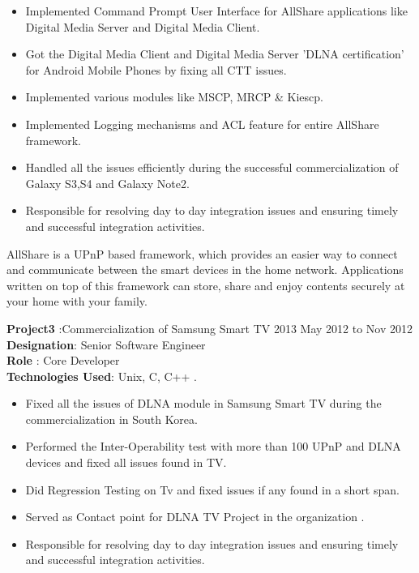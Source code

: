 \documentclass{resumeclass}
\begin{document}
\begin{resume}
 \begin{itemize} \itemsep -2pt
  \item  Implemented Command Prompt User Interface for AllShare applications like Digital Media Server and Digital Media Client.
  \item  Got the Digital Media Client and Digital Media Server 'DLNA certification' for Android Mobile Phones by fixing all CTT issues.
  \item  Implemented various modules like MSCP, MRCP \& Kiescp.
  \item  Implemented Logging mechanisms and ACL feature for entire AllShare framework.
  \item  Handled all the issues efficiently during the successful commercialization of Galaxy S3,S4 and Galaxy Note2.
  \item Responsible for resolving day to day integration issues and ensuring timely and successful integration activities.
\end{itemize} \vspace{-6pt}

AllShare is a UPnP based framework, which provides an easier way to connect and communicate between the smart devices in the home network. Applications written on top of this framework can store, share and enjoy contents securely at your home with your family.

\textbf{Project3} :Commercialization of Samsung Smart TV 2013 \hfill      May 2012 to Nov 2012 \\
\textbf{Designation}: Senior Software Engineer\\
\textbf{Role} : Core Developer\\
\textbf{Technologies Used}: Unix, C, C++ .

 \begin{itemize} \itemsep -2pt
  \item  Fixed all the issues of DLNA module in Samsung Smart TV during the commercialization in South Korea.
  \item  Performed the Inter-Operability test with more than 100 UPnP and DLNA devices and fixed all issues found in TV.
  \item  Did Regression Testing on Tv and fixed issues if any found in a short span.
  \item  Served as Contact point for DLNA TV Project in the organization .
  \item Responsible for resolving day to day integration issues and ensuring timely and successful integration activities.
\end{itemize} \vspace{-6pt}


\end{resume}
\end{document}
